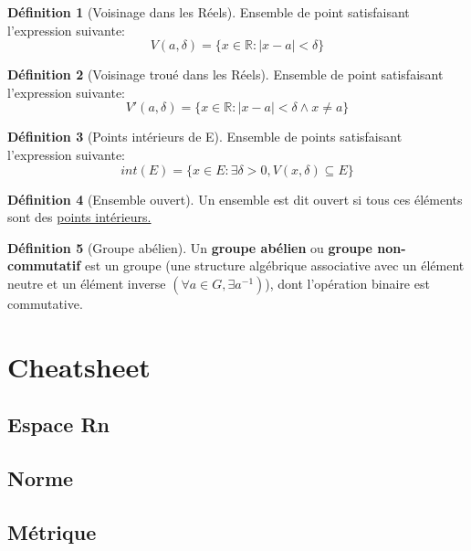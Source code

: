 \documentclass[12pt]{book}
\let\Bbb\mathbb
\newcommand\todo[1]{\phantom{#1}}
\theoremstyle{definition}
\newtheorem{definition}{Définition}[section]
\begin{document}
\begin{definition}[Voisinage dans les Réels]
    \label{def:voisinage_reels}
    Ensemble de point satisfaisant l'expression
    suivante: $$V(a, \delta) = \{ x \in \Bbb R : |x - a| < \delta \}$$
\end{definition}

\begin{definition}[Voisinage troué dans les Réels]
    \label{def:voisinage_troue_reels}
    Ensemble de point satisfaisant l'expression
    suivante: $$V'(a, \delta) = \{ x \in \Bbb R : |x - a| < \delta \land x \neq a \}$$
\end{definition}

\begin{definition}[Points intérieurs de E]
    \label{def:point_int}
    Ensemble de points satisfaisant l'expression
    suivante: $$int(E) = \{ x \in E : \exists \delta > 0, V(x, \delta) \subseteq E \} $$
\end{definition}

\begin{definition}[Ensemble ouvert]
    \label{def:ensemble_ouvert}
    Un ensemble est dit ouvert si tous ces éléments sont des \hyperref[def:point_int]{points intérieurs.}
\end{definition}

\begin{definition}[Groupe abélien]
    \label{def:groupe_abelien}
    Un \textbf{groupe abélien} ou \textbf{groupe non-commutatif} est un groupe
    (une structure algébrique associative avec un élément neutre et un élément inverse $(\forall a \in G, \exists a^{-1})$), 
    dont l'opération binaire est commutative.
\end{definition}
\todo{Add reference}

\chapter{Cheatsheet}
\section{Espace Rn}
\section{Norme}
\section{Métrique}
\end{document}
